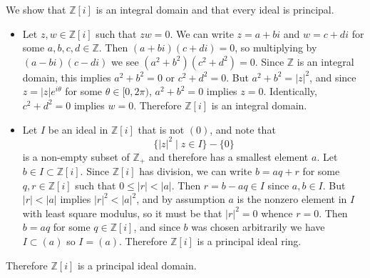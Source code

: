 \documentclass{article}
\begin{document}
\begin{Answer}
\begin{enumerate}[(a)]
{      We show that $\mathbb{Z}[i]$ is an integral domain and that
      every ideal is principal.
      \begin{itemize}
        \item{
          Let $z, w \in \mathbb{Z}[i]$ such that
          $zw = 0$. We can write $z = a + bi$ and $w = c + di$ for
          some $a, b, c, d \in \mathbb{Z}$.
          Then $(a + bi)(c + di) = 0$, so multiplying by
          $(a - bi)(c - di)$ we see $(a^2 + b^2)(c^2 + d^2) = 0$.
          Since $\mathbb{Z}$ is an integral domain, this implies
          $a^2 + b^2 = 0$ or $c^2 + d^2 = 0$. But $a^2 + b^2 = |z|^2$,
          and since $z = |z|e^{i \theta}$ for some
          $\theta \in [ 0, 2\pi )$, $a^2 + b^2 = 0$ implies $z = 0$.
          Identically, $c^2 + d^2 = 0$ implies $w = 0$. Therefore
          $\mathbb{Z}[i]$ is an integral domain.
        }
        \item{
          Let $I$ be an ideal in $\mathbb{Z}[i]$ that is not $(0)$, and
          note that
          $$
          \{ |z|^2 \mid z \in I \} - \{ 0 \}
          $$
          is a non-empty subset of $\mathbb{Z}_+$ and therefore has a
          smallest element $a$. Let $b \in I \subset \mathbb{Z}[i]$. Since
          $\mathbb{Z}[i]$ has division, we can write
          $b = aq + r$ for some $q, r \in \mathbb{Z}[i]$ such that
          $0 \leq |r| < |a|$. Then $r = b - aq \in I$ since $a, b \in I$.
          But $|r| < |a|$ implies $|r|^2 < |a|^2$, and by assumption
          $a$ is the nonzero element in $I$ with least square modulus, so
          it must be that $|r|^2 = 0$ whence $r = 0$. Then $b = aq$ for
          some $q \in \mathbb{Z}[i]$, and since $b$ was chosen arbitrarily
          we have $I \subset (a)$ so $I = (a)$. Therefore $\mathbb{Z}[i]$
          is a principal ideal ring.
        }
      \end{itemize}
      Therefore $\mathbb{Z}[i]$ is a principal ideal domain.
    }
  \end{enumerate}
\end{Answer}
\end{document}
